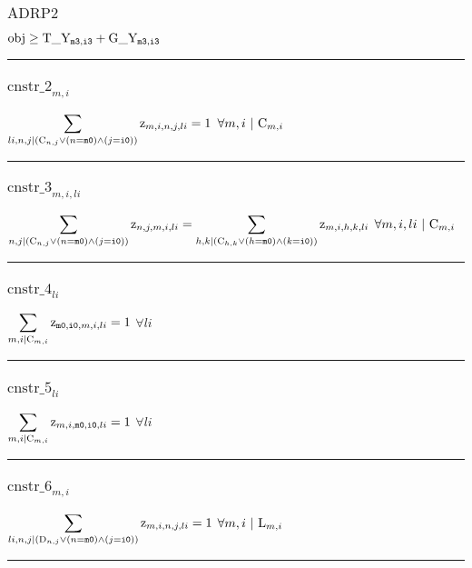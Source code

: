 \documentclass[11pt]{article}
\begin{document}
\subsubsection*{$\text{ADRP2}$} \label{ADRP2}
$
\textcolor{black}{\text{obj}} \geq \textcolor{black}{\text{T\_Y}}_{\texttt{m3}, \texttt{i3}} + \textcolor{black}{\text{G\_Y}}_{\texttt{m3}, \texttt{i3}}
$ \vspace{5pt}
\hrule 
\subsubsection*{$\text{cnstr\_2}_{m, i}$} \label{cnstr_2}
$
\displaystyle \sum_{li, n, j |  ( \textcolor{black}{\text{C}}_{n, j} \vee  ( n = \texttt{m0}  )  \wedge  ( j = \texttt{i0}  )  )}\textcolor{black}{\text{z}}_{m, i, n, j, li} = 1
$
\hfill
$
\forall{ m, i}  ~ | ~\textcolor{black}{\text{C}}_{m, i}
$ \vspace{5pt}
\hrule 
\subsubsection*{$\text{cnstr\_3}_{m, i, li}$} \label{cnstr_3}
$
\displaystyle \sum_{n, j |  ( \textcolor{black}{\text{C}}_{n, j} \vee  ( n = \texttt{m0}  )  \wedge  ( j = \texttt{i0}  )  )}\textcolor{black}{\text{z}}_{n, j, m, i, li} = \displaystyle \sum_{h, k |  ( \textcolor{black}{\text{C}}_{h, k} \vee  ( h = \texttt{m0}  )  \wedge  ( k = \texttt{i0}  )  )}\textcolor{black}{\text{z}}_{m, i, h, k, li}
$
\hfill
$
\forall{ m, i, li}  ~ | ~\textcolor{black}{\text{C}}_{m, i}
$ \vspace{5pt}
\hrule 
\subsubsection*{$\text{cnstr\_4}_{li}$} \label{cnstr_4}
$
\displaystyle \sum_{m, i | \textcolor{black}{\text{C}}_{m, i}}\textcolor{black}{\text{z}}_{\texttt{m0}, \texttt{i0}, m, i, li} = 1
$
\hfill
$
\forall{ li} 
$ \vspace{5pt}
\hrule 
\subsubsection*{$\text{cnstr\_5}_{li}$} \label{cnstr_5}
$
\displaystyle \sum_{m, i | \textcolor{black}{\text{C}}_{m, i}}\textcolor{black}{\text{z}}_{m, i, \texttt{m0}, \texttt{i0}, li} = 1
$
\hfill
$
\forall{ li} 
$ \vspace{5pt}
\hrule 
\subsubsection*{$\text{cnstr\_6}_{m, i}$} \label{cnstr_6}
$
\displaystyle \sum_{li, n, j |  ( \textcolor{black}{\text{D}}_{n, j} \vee  ( n = \texttt{m0}  )  \wedge  ( j = \texttt{i0}  )  )}\textcolor{black}{\text{z}}_{m, i, n, j, li} = 1
$
\hfill
$
\forall{ m, i}  ~ | ~\textcolor{black}{\text{L}}_{m, i}
$ \vspace{5pt}
\hrule 
\end{document}
